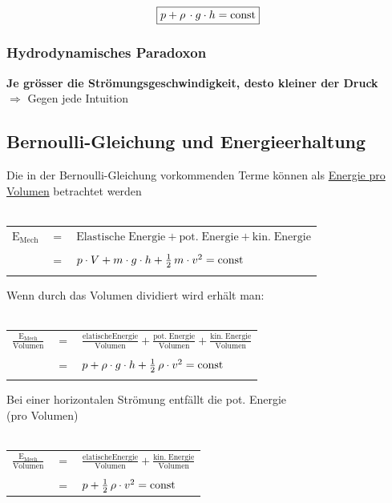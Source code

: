 $$  \boxed{ p + \rho \, \cdot g \cdot h =  \mathrm{const}} $$




\subsubsection{Hydrodynamisches Paradoxon}
\textbf{Je grösser die Strömungsgeschwindigkeit, desto kleiner der Druck} \\
$\Rightarrow$ Gegen jede Intuition





\subsection{Bernoulli-Gleichung und Energieerhaltung} %
Die in der Bernoulli-Gleichung vorkommenden Terme können als \underline{Energie pro Volumen} betrachtet werden \\
\\
\begin{tabular}{l c l}
$  \mathrm{E_{Mech}}$ & $=$ & $\mathrm{Elastische \; Energie +  pot. \; Energie + kin. \; Energie}$ \\
\\
& $=$ & $ p \cdot V + m \cdot g \cdot h + \frac{1}{2} \, m \cdot v^2 = \mathrm{const}$ \\
\\
\end{tabular}


Wenn durch das Volumen dividiert wird erhält man: \\
\\
\begin{tabular}{l c l}
$  \mathrm{\frac{E_{Mech}}{Volumen}}$ & $=$ & $\mathrm{\frac{elatische Energie}{Volumen}   + \frac{pot. \; Energie}{Volumen} + \frac{kin. \; Energie}{Volumen}}$ \\
\\
& $=$ & $ p + \rho \cdot g \cdot h + \frac{1}{2} \,  \rho \cdot v^2 =\mathrm{const}$ \\
\\
\end{tabular}


Bei einer horizontalen Strömung entfällt die pot. Energie\\
(pro Volumen) \\
\\

\begin{tabular}{l c l}
$ \mathrm{ \frac{E_{Mech}}{Volumen}}$ & $=$ & $\mathrm{ \frac{elatische Energie}{Volumen} + \frac{kin. \; Energie}{Volumen} }$ \\
\\
& $=$ & $ p + \frac{1}{2} \, \rho \cdot v^2 = \mathrm{const}$ \\
\end{tabular}





